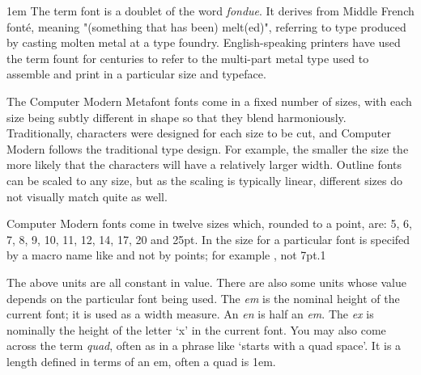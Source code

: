 \setlength{\columnsep}{2em}
\begin{multicols}{2}
\parskip1em
The term font is a doublet of the word {\em fondue}. It derives from Middle French font\'e, meaning "(something that has been) melt(ed)", referring to type produced by casting molten metal at a type foundry. English-speaking printers have used the term fount for centuries to refer to the multi-part metal type used to assemble and print in a particular size and typeface.


The Computer Modern Metafont fonts come in a fixed number of sizes, with each size
being subtly different in shape so that they blend harmoniously. Traditionally, characters
were designed for each size to be cut, and Computer Modern follows the traditional type
design. For example, the smaller the size the more likely that the characters will have a
relatively larger width. Outline fonts can be scaled to any size, but as the scaling is typically
linear, different sizes do not visually match quite as well.



Computer Modern fonts come in twelve sizes which, rounded to a point, are: 5, 6, 7,
8, 9, 10, 11, 12, 14, 17, 20 and 25pt. In \latex the size for a particular font is specifed by
a macro name like  and not by points; for example \cs{\scriptsize}, not 7pt.1

The above units are all constant in value. There are also some units whose value depends
on the particular font being used. The {\em em} is the nominal height of the current font;
it is used as a width measure. An {\em en} is half an {\em em}. The \textit{ex} is nominally the height of the
letter ‘x’ in the current font. You may also come across the term {\em quad}, often as in a phrase
like ‘starts with a quad space’. It is a length defined in terms of an em, often a quad is 1em.
\bigskip


\end{multicols}
